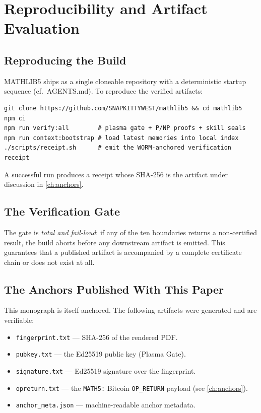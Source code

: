 \chapter{Reproducibility and Artifact Evaluation}
\label{ch:artifact}

\section{Reproducing the Build}
\label{sec:artifact-build}

MATHLIB5 ships as a single cloneable repository with a deterministic
startup sequence (cf.\ AGENTS.md). To reproduce the verified artifacts:

\begin{lstlisting}[language=BashX,caption={Reproducing the MATHLIB5
  verification chain.},label=lst:repro]
git clone https://github.com/SNAPKITTYWEST/mathlib5 && cd mathlib5
npm ci
npm run verify:all        # plasma gate + P/NP proofs + skill seals
npm run context:bootstrap # load latest memories into local index
./scripts/receipt.sh      # emit the WORM-anchored verification receipt
\end{lstlisting}

A successful run produces a receipt whose SHA-256 is the artifact under
discussion in \cref{ch:anchors}.

\section{The Verification Gate}
\label{sec:artifact-gate}

The gate is \emph{total and fail-loud}: if any of the ten boundaries
returns a non-certified result, the build aborts before any downstream
artifact is emitted. This guarantees that a published artifact is
accompanied by a complete certificate chain or does not exist at all.

\section{The Anchors Published With This Paper}
\label{sec:artifact-anchors}

This monograph is itself anchored. The following artifacts were generated
and are verifiable:

\begin{itemize}
  \item \texttt{fingerprint.txt} --- SHA-256 of the rendered PDF.
  \item \texttt{pubkey.txt} --- the Ed25519 public key (Plasma Gate).
  \item \texttt{signature.txt} --- Ed25519 signature over the fingerprint.
  \item \texttt{opreturn.txt} --- the \texttt{MATH5:} Bitcoin
        \texttt{OP\_RETURN} payload (see \cref{ch:anchors}).
  \item \texttt{anchor\_meta.json} --- machine-readable anchor metadata.
\end{itemize}

